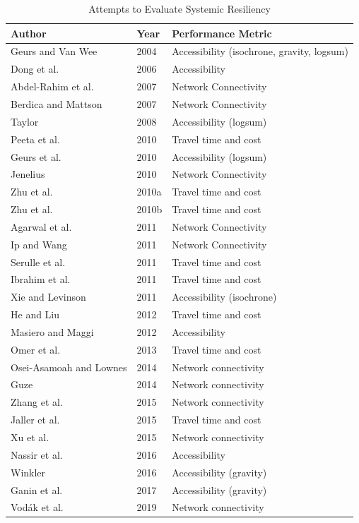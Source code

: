 \begin{table}

\caption{\label{tab:authortable}Attempts to Evaluate Systemic Resiliency}
\centering
\begin{tabular}[t]{lll}
\toprule
Author & Year & Performance Metric\\
\midrule
Geurs and Van Wee & 2004 & Accessibility (isochrone, gravity, logsum)\\
Dong et al. & 2006 & Accessibility\\
Abdel-Rahim et al. & 2007 & Network Connectivity\\
Berdica and Mattson & 2007 & Network Connectivity\\
\addlinespace
Taylor & 2008 & Accessibility (logsum)\\
Peeta et al. & 2010 & Travel time and cost\\
Geurs et al. & 2010 & Accessibility (logsum)\\
Jenelius & 2010 & Network Connectivity\\
Zhu et al. & 2010a & Travel time and cost\\
\addlinespace
Zhu et al. & 2010b & Travel time and cost\\
Agarwal et al. & 2011 & Network Connectivity\\
Ip and Wang & 2011 & Network Connectivity\\
Serulle et al. & 2011 & Travel time and cost\\
Ibrahim et al. & 2011 & Travel time and cost\\
\addlinespace
Xie and Levinson & 2011 & Accessibility (isochrone)\\
He and Liu & 2012 & Travel time and cost\\
Masiero and Maggi & 2012 & Accessibility \\
Omer et al. & 2013 & Travel time and cost\\
Osei-Asamoah and Lownes & 2014 & Network connectivity\\
\addlinespace
Guze & 2014 & Network connectivity\\
Zhang et al. & 2015 & Network connectivity\\
Jaller et al. & 2015 & Travel time and cost\\
Xu et al. & 2015 & Network connectivity\\
Nassir et al. & 2016 & Accessibility \\
\addlinespace
Winkler & 2016 & Accessibility (gravity)\\
Ganin et al. & 2017 & Accessibility (gravity)\\
Vodák et al. & 2019 & Network connectivity\\
\bottomrule
\end{tabular}
\end{table}

